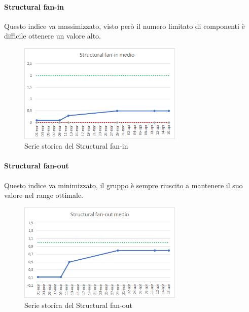     \paragraph{Structural fan-in} \Spazio
    Questo indice va massimizzato, visto però il numero limitato di componenti è difficile ottenere un valore alto.
    \begin{figure}[H]
    	\centering 
    	\includegraphics[width=0.7\textwidth]{Images/SFIN.png}
    	\caption{Serie storica del Structural fan-in}
    	\label{SFIN} 
    \end{figure}
    \paragraph{Structural fan-out} \Spazio
    Questo indice va minimizzato, il gruppo è sempre riuscito a mantenere il suo valore nel range ottimale.
    \begin{figure}[H]
    	\centering 
    	\includegraphics[width=0.7\textwidth]{Images/SFOUT.png}
    	\caption{Serie storica del Structural fan-out}
    	\label{SFOUT} 
    \end{figure}
